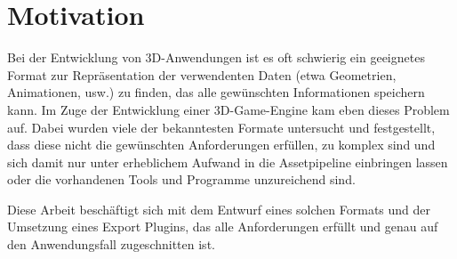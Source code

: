 \chapter{Motivation}
Bei der Entwicklung von 3D-Anwendungen ist es oft schwierig ein geeignetes Format zur Repräsentation der verwendenten Daten (etwa Geometrien, Animationen, usw.) zu finden, das alle gewünschten Informationen speichern kann. Im Zuge der Entwicklung einer 3D-Game-Engine kam eben dieses Problem auf. Dabei wurden viele der bekanntesten Formate untersucht und festgestellt, dass diese nicht die gewünschten Anforderungen erfüllen, zu komplex sind und sich damit nur unter erheblichem Aufwand in die Assetpipeline einbringen lassen oder die vorhandenen Tools und Programme unzureichend sind.

Diese Arbeit beschäftigt sich mit dem Entwurf eines solchen Formats und der Umsetzung eines Export Plugins, das alle Anforderungen erfüllt und genau auf den Anwendungsfall zugeschnitten ist.
